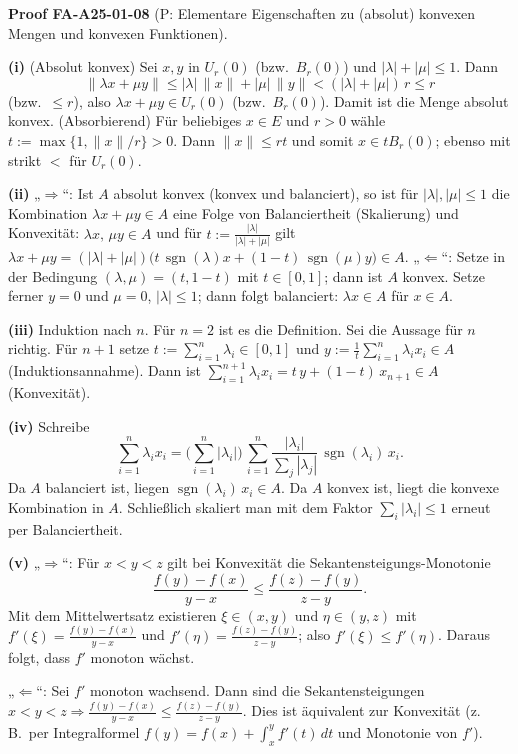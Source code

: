 \documentclass[10pt, letterpaper]{article}
\newcommand{\CustomHeading}[3]{%
  \par\medskip\noindent%
  \textbf{#1 #2} \textnormal{(#3)}.\enskip%
}
\newenvironment{PROOF}[2]{\begin{unitbox}\CustomHeading{Proof}{#1}{#2}}{\end{unitbox}}
\begin{document}
\begin{PROOF}{FA-A25-01-08}{P: Elementare Eigenschaften zu (absolut) konvexen Mengen und konvexen Funktionen}
\textbf{(i)} (Absolut konvex) Sei $x,y$ in $U_r(0)$ (bzw.\ $B_r(0)$) und $|\lambda|+|\mu|\le 1$.
Dann
\[
\|\lambda x+\mu y\|\le |\lambda|\,\|x\|+|\mu|\,\|y\| < (|\lambda|+|\mu|)\,r \le r
\]
(bzw.\ $\le r$), also $\lambda x+\mu y\in U_r(0)$ (bzw.\ $B_r(0)$). Damit ist die Menge absolut konvex.
(Absorbierend) Für beliebiges $x\in E$ und $r>0$ wähle $t:=\max\{1,\|x\|/r\}>0$. Dann
$\|x\| \le rt$ und somit $x\in t B_r(0)$; ebenso mit strikt $<$ für $U_r(0)$.
\medskip

\textbf{(ii)} „$\Rightarrow$“: Ist $A$ absolut konvex (konvex und balanciert), so ist für $|\lambda|,|\mu|\le 1$
die Kombination $\lambda x+\mu y\in A$ eine Folge von Balanciertheit (Skalierung) und Konvexität:
$\lambda x,\,\mu y\in A$ und für $t:=\frac{|\lambda|}{|\lambda|+|\mu|}$ gilt
$\lambda x+\mu y=(|\lambda|+|\mu|)\big(t\,\operatorname{sgn}(\lambda)x+(1-t)\,\operatorname{sgn}(\mu)y\big)\in A$.
„$\Leftarrow$“: Setze in der Bedingung $(\lambda,\mu)=(t,1-t)$ mit $t\in[0,1]$; dann ist $A$ konvex.
Setze ferner $y=0$ und $\mu=0$, $|\lambda|\le 1$; dann folgt balanciert: $\lambda x\in A$ für $x\in A$. 

\medskip
\textbf{(iii)} Induktion nach $n$. Für $n=2$ ist es die Definition. 
Sei die Aussage für $n$ richtig. Für $n+1$ setze
$t:=\sum_{i=1}^{n}\lambda_i\in[0,1]$ und $y:=\frac{1}{t}\sum_{i=1}^{n}\lambda_i x_i\in A$ (Induktionsannahme).
Dann ist $\sum_{i=1}^{n+1}\lambda_i x_i=t\,y+(1-t)\,x_{n+1}\in A$ (Konvexität). 

\medskip
\textbf{(iv)} Schreibe
\[
\sum_{i=1}^{n}\lambda_i x_i=\Big(\sum_{i=1}^{n}|\lambda_i|\Big)\,
\sum_{i=1}^{n}\frac{|\lambda_i|}{\sum_{j}|\lambda_j|}\,\operatorname{sgn}(\lambda_i)\,x_i.
\]
Da $A$ balanciert ist, liegen $\operatorname{sgn}(\lambda_i)\,x_i\in A$. 
Da $A$ konvex ist, liegt die konvexe Kombination in $A$. Schließlich skaliert man 
mit dem Faktor $\sum_i|\lambda_i|\le 1$ erneut per Balanciertheit. 

\medskip
\textbf{(v)} „$\Rightarrow$“: Für $x<y<z$ gilt bei Konvexität die Sekantensteigungs-Monotonie
\[
\frac{f(y)-f(x)}{y-x}\le \frac{f(z)-f(y)}{z-y}.
\]
Mit dem Mittelwertsatz existieren $\xi\in(x,y)$ und $\eta\in(y,z)$ mit
$f'(\xi)=\frac{f(y)-f(x)}{y-x}$ und $f'(\eta)=\frac{f(z)-f(y)}{z-y}$; also $f'(\xi)\le f'(\eta)$.
Daraus folgt, dass $f'$ monoton wächst.

„$\Leftarrow$“: Sei $f'$ monoton wachsend. Dann sind die Sekantensteigungen 
$x<y<z\Rightarrow \frac{f(y)-f(x)}{y-x}\le \frac{f(z)-f(y)}{z-y}$.
Dies ist äquivalent zur Konvexität (z.\,B.\ per Integralformel
$f(y)=f(x)+\int_{x}^{y}f'(t)\,dt$ und Monotonie von $f'$).
\end{PROOF}
\end{document}
